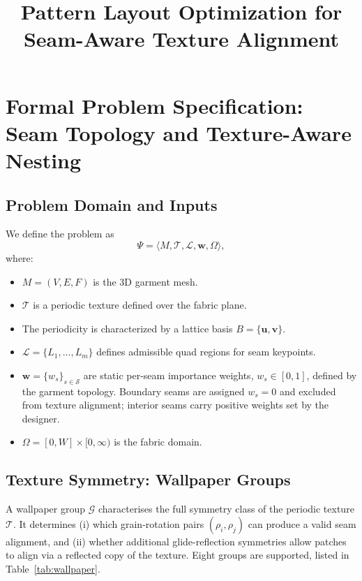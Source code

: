 \documentclass[runningheads]{llncs}
\begin{document}
\title{Pattern Layout Optimization for \\ Seam-Aware Texture Alignment}

\section{Formal Problem Specification: Seam Topology and Texture-Aware Nesting}

\subsection{Problem Domain and Inputs}

We define the problem as
\[
\Psi = \langle M, \mathcal{T}, \mathcal{L}, \mathbf{w}, \Omega \rangle,
\]
where:

\begin{itemize}
    \item $M = (V,E,F)$ is the 3D garment mesh.
    \item $\mathcal{T}$ is a periodic texture defined over the fabric plane.
    \item The periodicity is characterized by a lattice basis $B = \{\mathbf{u}, \mathbf{v}\}$.
    \item $\mathcal{L} = \{L_1, \dots, L_m\}$ defines admissible quad regions for seam keypoints.
    \item $\mathbf{w} = \{w_s\}_{s \in \mathcal{S}}$ are static per-seam importance weights, $w_s \in [0,1]$,
          defined by the garment topology. Boundary seams are assigned $w_s = 0$ and excluded
          from texture alignment; interior seams carry positive weights set by the designer.
    \item $\Omega = [0,W] \times [0,\infty)$ is the fabric domain.
\end{itemize}

\subsection{Texture Symmetry: Wallpaper Groups}

A wallpaper group $\mathcal{G}$ characterises the full symmetry class of the periodic
texture $\mathcal{T}$.
It determines (i) which grain-rotation pairs $(\rho_i, \rho_j)$ can produce a
valid seam alignment, and (ii) whether additional glide-reflection symmetries
allow patches to align via a reflected copy of the texture.
Eight groups are supported, listed in Table~\ref{tab:wallpaper}.
\end{document}
